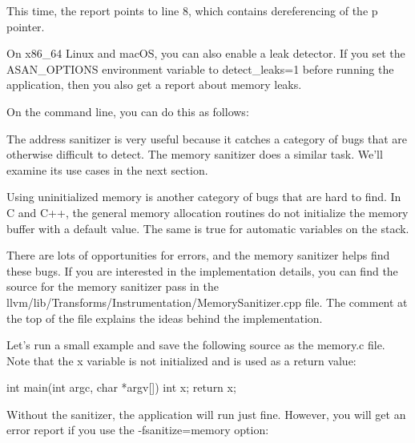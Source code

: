 This time, the report points to line 8, which contains dereferencing of the p pointer.

On x86\_64 Linux and macOS, you can also enable a leak detector. If you set the ASAN\_OPTIONS environment variable to detect\_leaks=1 before running the application, then you also get a report about memory leaks.

On the command line, you can do this as follows:


The address sanitizer is very useful because it catches a category of bugs that are otherwise difficult to detect. The memory sanitizer does a similar task. We’ll examine its use cases in the next section.


Using uninitialized memory is another category of bugs that are hard to find. In C and C++, the general memory allocation routines do not initialize the memory buffer with a default value. The same is true for automatic variables on the stack.

There are lots of opportunities for errors, and the memory sanitizer helps find these bugs. If you are interested in the implementation details, you can find the source for the memory sanitizer pass in the llvm/lib/Transforms/Instrumentation/MemorySanitizer.cpp file. The comment at the top of the file explains the ideas behind the implementation.

Let’s run a small example and save the following source as the memory.c file. Note that the x variable is not initialized and is used as a return value:

\begin{cpp}
int main(int argc, char *argv[]) {
    int x;
    return x;
}
\end{cpp}

Without the sanitizer, the application will run just fine. However, you will get an error report if you use the -fsanitize=memory option:


